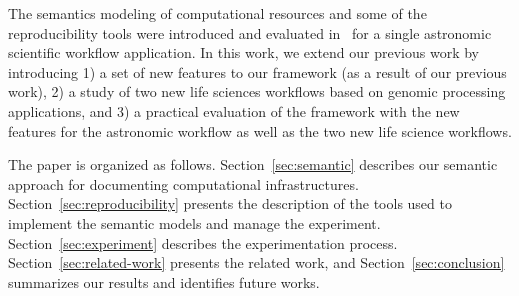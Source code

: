 
The semantics modeling of computational resources and some of the reproducibility tools 
were introduced and evaluated in~\cite{SantanaPerez-REPPAR-2014} for a single astronomic 
scientific workflow application. In this work, we extend our previous work by introducing 1) a set 
of new features to our framework (as a result of our previous work), 2) a study of two new life 
sciences workflows based on genomic processing applications, and 3) a practical evaluation 
of the framework with the new features for the astronomic workflow as well as the two new 
life science workflows. 

The paper is organized as follows. Section~\ref{sec:semantic} describes our semantic approach 
for documenting computational infrastructures. Section~\ref{sec:reproducibility} presents the 
description of the tools used to implement the semantic models and manage the experiment. 
Section~\ref{sec:experiment} describes the experimentation process. Section~\ref{sec:related-work} 
presents the related work, and Section~\ref{sec:conclusion} summarizes our results and 
identifies future works.


